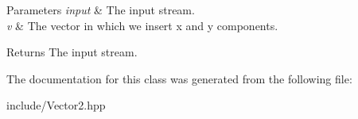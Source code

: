 \begin{DoxyParams}{Parameters}
{\em input} & The input stream. \\
\hline
{\em v} & The vector in which we insert x and y components. \\
\hline
\end{DoxyParams}
\begin{DoxyReturn}{Returns}
The input stream. 
\end{DoxyReturn}


The documentation for this class was generated from the following file\+:\begin{DoxyCompactItemize}
\item 
include/Vector2.\+hpp\end{DoxyCompactItemize}
